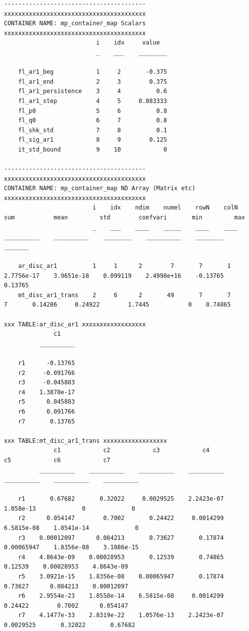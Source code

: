 \documentclass[
]{book}
\begin{document}
\begin{verbatim}
----------------------------------------
xxxxxxxxxxxxxxxxxxxxxxxxxxxxxxxxxxxxxxxx
CONTAINER NAME: mp_container_map Scalars
xxxxxxxxxxxxxxxxxxxxxxxxxxxxxxxxxxxxxxxx
                          i    idx     value  
                          _    ___    ________

    fl_ar1_beg            1     2       -0.375
    fl_ar1_end            2     3        0.375
    fl_ar1_persistence    3     4          0.6
    fl_ar1_step           4     5     0.083333
    fl_p0                 5     6          0.8
    fl_q0                 6     7          0.8
    fl_shk_std            7     8          0.1
    fl_sig_ar1            8     9        0.125
    it_std_bound          9    10            0

----------------------------------------
xxxxxxxxxxxxxxxxxxxxxxxxxxxxxxxxxxxxxxxx
CONTAINER NAME: mp_container_map ND Array (Matrix etc)
xxxxxxxxxxxxxxxxxxxxxxxxxxxxxxxxxxxxxxxx
                         i    idx    ndim    numel    rowN    colN       sum           mean         std        coefvari       min         max  
                         _    ___    ____    _____    ____    ____    __________    __________    ________    __________    ________    _______

    ar_disc_ar1          1     1      2        7       7       1      2.7756e-17    3.9651e-18    0.099119    2.4998e+16    -0.13765    0.13765
    mt_disc_ar1_trans    2     6      2       49       7       7               7       0.14286     0.24922        1.7445           0    0.74865

xxx TABLE:ar_disc_ar1 xxxxxxxxxxxxxxxxxx
              c1    
          __________

    r1      -0.13765
    r2     -0.091766
    r3     -0.045883
    r4    1.3878e-17
    r5      0.045883
    r6      0.091766
    r7       0.13765

xxx TABLE:mt_disc_ar1_trans xxxxxxxxxxxxxxxxxx
              c1            c2            c3            c4            c5            c6            c7    
          __________    __________    __________    __________    __________    __________    __________

    r1       0.67682       0.32022     0.0029525    2.2423e-07     1.058e-13             0             0
    r2      0.054147        0.7002       0.24422     0.0014299    6.5815e-08    1.8541e-14             0
    r3    0.00012097      0.084213       0.73627       0.17874    0.00065947    1.8356e-08    3.1086e-15
    r4    4.8643e-09    0.00028953       0.12539       0.74865       0.12539    0.00028953    4.8643e-09
    r5    3.0921e-15    1.8356e-08    0.00065947       0.17874       0.73627      0.084213    0.00012097
    r6    2.9554e-23    1.8558e-14    6.5815e-08     0.0014299       0.24422        0.7002      0.054147
    r7    4.1477e-33    2.8319e-22    1.0576e-13    2.2423e-07     0.0029525       0.32022       0.67682


\end{verbatim}
\end{document}
